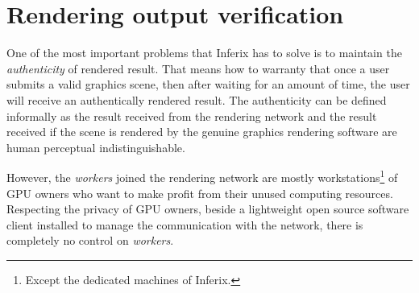 \section[Rendering output verification]{Rendering output verification}\label{sec:output_verification}
One of the most important problems that Inferix has to solve is to maintain the \emph{authenticity} of rendered result. That means how to warranty that once a user submits a valid graphics scene, then after waiting for an amount of time, the user will receive an authentically rendered result. The authenticity can be defined informally as the result received from the rendering network and the result received if the scene is rendered by the genuine graphics rendering software are human perceptual indistinguishable.

However, the \emph{workers} joined the rendering network are mostly workstations\footnote{Except the dedicated machines of Inferix.} of GPU owners who want to make profit from their unused computing resources. Respecting the privacy of GPU owners, beside a lightweight open source software client installed to manage the communication with the network, there is completely no control on \emph{workers}.





